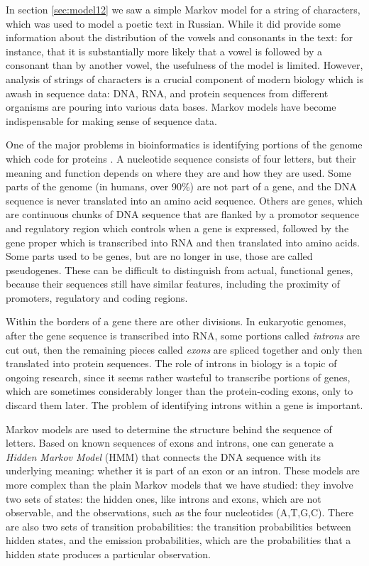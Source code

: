 \documentclass[
]{book}
\theoremstyle{definition}
\theoremstyle{definition}
\theoremstyle{definition}
\theoremstyle{remark}
\begin{document}
\label{sec:bio12}

In section \ref{sec:model12} we saw a simple Markov model for a string of characters, which was used to model a poetic text in Russian. While it did provide some information about the distribution of the vowels and consonants in the text: for instance, that it is substantially more likely that a vowel is followed by a consonant than by another vowel, the usefulness of the model is limited. However, analysis of strings of characters is a crucial component of modern biology which is awash in sequence data: DNA, RNA, and protein sequences from different organisms are pouring into various data bases. Markov models have become indispensable for making sense of sequence data.

One of the major problems in bioinformatics is identifying portions of the genome which code for proteins \citep{pevsner_bioinformatics_2009}. A nucleotide sequence consists of four letters, but their meaning and function depends on where they are and how they are used. Some parts of the genome (in humans, over 90\%) are not part of a gene, and the DNA sequence is never translated into an amino acid sequence. Others are genes, which are continuous chunks of DNA sequence that are flanked by a promotor sequence and regulatory region which controls when a gene is expressed, followed by the gene proper which is transcribed into RNA and then translated into amino acids. Some parts used to be genes, but are no longer in use, those are called pseudogenes. These can be difficult to distinguish from actual, functional genes, because their sequences still have similar features, including the proximity of promoters, regulatory and coding regions.

Within the borders of a gene there are other divisions. In eukaryotic genomes, after the gene sequence is transcribed into RNA, some portions called \emph{introns} are cut out, then the remaining pieces called \emph{exons} are spliced together and only then translated into protein sequences. The role of introns in biology is a topic of ongoing research, since it seems rather wasteful to transcribe portions of genes, which are sometimes considerably longer than the protein-coding exons, only to discard them later. The problem of identifying introns within a gene is important.

Markov models are used to determine the structure behind the sequence of letters. Based on known sequences of exons and introns, one can generate a \emph{Hidden Markov Model} (HMM) that connects the DNA sequence with its underlying meaning: whether it is part of an exon or an intron. These models are more complex than the plain Markov models that we have studied: they involve two sets of states: the hidden ones, like introns and exons, which are not observable, and the observations, such as the four nucleotides (A,T,G,C). There are also two sets of transition probabilities: the transition probabilities between hidden states, and the emission probabilities, which are the probabilities that a hidden state produces a particular observation.
\end{document}
